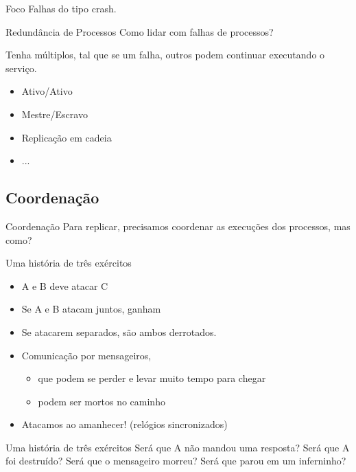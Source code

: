 \begin{frame}{Foco}
Falhas do tipo crash.
\end{frame}

\begin{frame}{Redundância de Processos}
Como lidar com falhas de processos? 

Tenha múltiplos, tal que se um falha, outros podem continuar executando o serviço.

\begin{itemize}
	\item Ativo/Ativo
	\item Mestre/Escravo
	\item Replicação em cadeia
	\item ...
\end{itemize}
\end{frame}





\subsection{Coordenação}

\begin{frame}{Coordenação}
Para replicar, precisamos coordenar as execuções dos processos, mas como?
\end{frame}

\begin{frame}{Uma história de três exércitos}
	\begin{itemize}
		\item A e B deve atacar C
		\item Se A e B atacam juntos, ganham
		\item Se atacarem separados, são ambos derrotados.
		\item Comunicação por mensageiros, 
		\begin{itemize}
			\item que podem se perder e levar muito tempo para chegar
			\item podem ser mortos no caminho
		\end{itemize}
	\pause
		\item Atacamos ao amanhecer! (relógios sincronizados)	
	\end{itemize}
\end{frame}

\begin{frame}{Uma história de três exércitos}
Será que A não mandou uma resposta? Será que A foi destruído? Será que o mensageiro morreu? Será que parou em um inferninho?
\end{frame}

